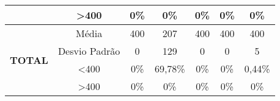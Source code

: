 \begin{table}[]
\begin{tabular}{|c|c|ccccc|}
                                & \textgreater 400 & 0\%            & 0\%            & 0\%            & 0\%            & 0\%            \\ \hline
\multirow{4}{*}{\textbf{TOTAL}} & Média            & 400               & 207               & 400               & 400               & 400               \\
                                & Desvio Padrão    & 0                 & 129               & 0                 & 0                 & 5                 \\
                                & \textless 400    & 0\%            & 69,78\%           & 0\%            & 0\%            & 0,44\%            \\
                                & \textgreater 400 & 0\%            & 0\%            & 0\%            & 0\%            & 0\%            \\ \hline
\end{tabular}
\end{table}
